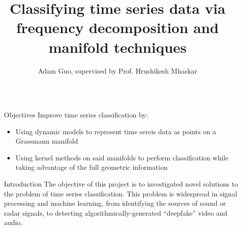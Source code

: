 \documentclass[final]{beamer}
\title{Classifying time series data via frequency decomposition and manifold techniques} %
\author{Adam Guo, supervised by Prof. Hrushikesh Mhaskar} %
\institute{Pomona College ('22), Claremont Graduate University} %
\newlength{\sepwid}
\newlength{\onecolwid}
\newcommand{\lbr}{\vspace{0.5in}}
\begin{document}

\setlength{\belowcaptionskip}{2ex} %
\setlength\belowdisplayshortskip{2ex} %

\begin{frame}[t] %

\begin{columns}[t] %

\begin{column}{\sepwid}\end{column} %

\begin{column}{\onecolwid} %


\begin{alertblock}{Objectives}
    Improve time series classification by:
    \begin{itemize}
        \item Using dynamic models to represent time sereis data as points on a Grassmann manifold
        \item Using kernel methods on said manifolds to perform classification while taking
            advantage of the full geometric information
    \end{itemize}
\end{alertblock}


\begin{block}{Introduction}
    The objective of this project is to investigated novel solutions to the problem of
    time series classification. This problem is widespread in signal processing and machine
    learning, from identifying the sources of sound or radar signals, to detecting
    algorithmically-generated ``deepfake'' video and audio. \lbr


\end{block}
\end{column}
\end{columns}
\end{frame}
\end{document}
